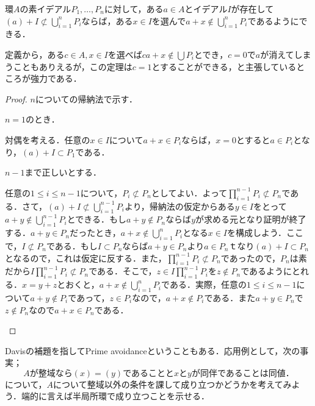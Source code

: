 \begin{thm}[Davisの補題]\label{thm:Davisの補題}
	環$A$の素イデアル$P_1,\dots,P_n$に対して，ある$a\in A$とイデアル$I$が存在して$(a)+I\not\subset\bigcup_{i=1}^n P_i$ならば，ある$x\in I$を選んで$a+x\not\in\bigcup_{i=1}^n P_i$であるようにできる．
\end{thm}

定義から，ある$c\in A,x\in I$を選べば$ca+x\not\in\bigcup P_i$とでき，$c=0$で$a$が消えてしまうこともありえるが，この定理は$c=1$とすることができる，と主張しているところが強力である．

\begin{proof}
	$n$についての帰納法で示す．
	
	\begin{step}
		\item $n=1$のとき．
		
		対偶を考える．任意の$x\in I$について$a+x\in P_i$ならば，$x=0$とすると$a\in P_i$となり，$(a)+I\subset P_1$である．
		
		\item $n-1$まで正しいとする．
		
		任意の$1\leq i\leq n-1$について，$P_i\not\subset P_n$としてよい．よって$\prod_{i=1}^{n-1}P_i\not\subset P_n$である．さて，$(a)+I\not\subset\bigcup_{i=1}^{n-1}P_i$より，帰納法の仮定からある$y\in I$をとって$a+y\not\in\bigcup_{i=1}^{n-1}P_i$とできる．もし$a+y\not\in P_n$ならば$y$が求める元となり証明が終了する．$a+y\in P_n$だったとき，$a+x\not\in \bigcup_{i=1}^n P_i$となる$x\in I$を構成しよう．ここで，$I\not\subset P_n$である．もし$I\subset P_n$ならば$a+y\in P_n$より$a\in P_n$ｔなり$(a)+I\subset P_n$となるので，これは仮定に反する．また，$\prod_{i=1}^{n-1}P_i\not\subset P_n$であったので，$P_n$は素だから$I\prod_{i=1}^{n-1}P_i\not\subset P_n$である．そこで，$z\in I\prod_{i=1}^{n-1}P_i$を$z\not\in P_n$であるようにとれる．$x=y+z$とおくと，$a+x\not\in\bigcup_{i=1}^n P_i$である．実際，任意の$1\leq i\leq n-1$について$a+y\not\in P_i$であって，$z\in P_i$なので，$a+x\not\in P_i$である．また$a+y\in P_n$で$z\not\in P_n$なので$a+x\in P_n$である．	
	\end{step}
\end{proof}

Davisの補題を指してPrime avoidanceということもある．応用例として，次の事実；
\[A\text{が整域なら}(x)=(y)\text{であることと}x\text{と}y\text{が同伴であることは同値．}\]
について，$A$について整域以外の条件を課して成り立つかどうかを考えてみよう．端的に言えば半局所環で成り立つことを示せる．

